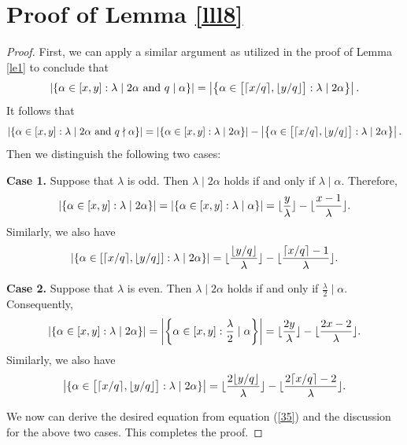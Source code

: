 \documentclass[journal,onecolumn]{IEEEtran}
\begin{document}
\section{Proof of Lemma \ref{lll8}}
\begin{proof}
First, we can apply a similar argument as utilized in the proof of Lemma \ref{le1} to conclude that 
    \begin{equation}\notag
   \left|  \{\alpha\in [x,y]:\lambda\mid 2\alpha \hbox{ and }q\mid \alpha \}\right|=\left| \left\{\alpha\in \big[\lceil {x}/{q}\rceil,\lfloor {y}/{q}\rfloor\big]: \lambda\mid 2\alpha\right\}\right|.
 \end{equation}
It follows that 
\begin{equation}\label{35}
    \left|  \{\alpha\in [x,y]:\lambda\mid 2\alpha \hbox{ and }q\nmid \alpha \}\right| =\left|  \{\alpha\in [x,y]:\lambda\mid 2\alpha \}\right|-\left| \left\{\alpha\in \big[\lceil {x}/{q}\rceil,\lfloor {y}/{q}\rfloor\big]: \lambda\mid 2\alpha\right\}\right|.
\end{equation}
Then we distinguish the   following two cases:

\textbf{Case 1.}
 Suppose that $\lambda$ is odd. Then $\lambda\mid 2\alpha$ holds if and only if $\lambda \mid \alpha.$ Therefore, 
\begin{equation}\notag
    \left|  \{\alpha\in [x,y]: \lambda\mid 2\alpha\}      \right| = \left| \{\alpha\in [x,y]: \lambda\mid \alpha\}   \right|=\lfloor\frac{y}{\lambda}\rfloor -\lfloor\frac{x-1}{\lambda} \rfloor.
\end{equation}
 Similarly, we also have 
\begin{equation}\notag
    \left|  \{\alpha\in [\lceil {x}/{q} \rceil, \lfloor {y}/{q} \rfloor]: \lambda\mid 2\alpha\}      \right| = \lfloor \frac{\lfloor y/q\rfloor}{\lambda}\rfloor-\lfloor \frac{\lceil {x}/{q} \rceil-1}{\lambda} \rfloor.
\end{equation}

\textbf{Case 2.} Suppose that $ \lambda$ is even. Then  $\lambda\mid 2\alpha$ holds if and only if $\frac{\lambda}{2}\mid \alpha$. Consequently, 
 \begin{equation}\notag
    \left|  \{\alpha\in [x,y]: \lambda\mid 2\alpha\}      \right| = \left| \left\{\alpha\in [x,y]: \frac{\lambda}{2} \mid \alpha\right\}   \right|=\lfloor\frac{2y}{\lambda}\rfloor -\lfloor\frac{2x-2}{\lambda} \rfloor.
\end{equation}
 Similarly, we also have 
\begin{equation}\notag
    \left|  \{\alpha \in \big[\lceil {x}/{q} \rceil, \lfloor 
{y}/{q} \rfloor\big]: \lambda\mid 2\alpha \}      \right| = \lfloor \frac{2\lfloor  y/q\rfloor}{\lambda}\rfloor-\lfloor \frac{2\lceil {x}/{q} \rceil-2}{\lambda} \rfloor.
\end{equation}

 We now can derive the desired equation 
from equation (\ref{35}) and the discussion for the above two cases.  This completes the proof. 
\end{proof}
\end{document}
